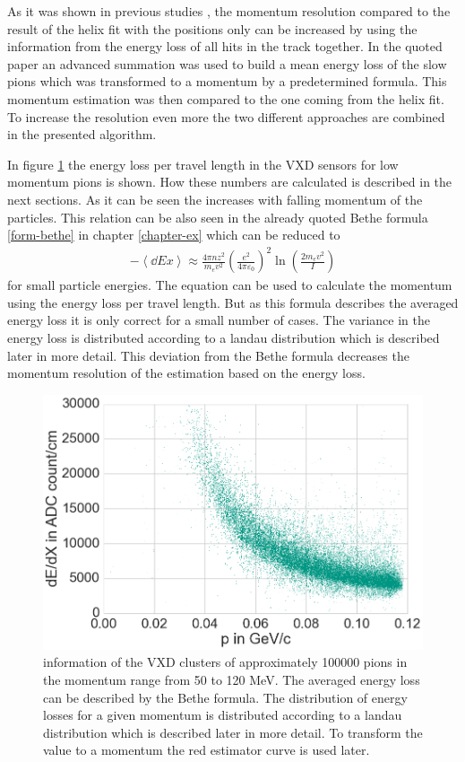 As it was shown in previous studies \cite{robert}, the momentum resolution compared to the result of the helix fit with the positions only can be increased by using the information from the energy loss of all hits in the track together. In the quoted paper an advanced summation was used to build a mean energy loss of the slow pions which was transformed to a momentum by a predetermined formula. This momentum estimation was then compared to the one coming from the helix fit. To increase the resolution even more the two different approaches are combined in the presented algorithm.

In figure \ref{fig-dedx-over-p} the energy loss per travel length in the VXD sensors for low momentum pions is shown. How these numbers are calculated is described in the next sections. As it can be seen the \dedx increases with falling momentum of the particles. This relation can be also seen in the already quoted Bethe formula \ref{form-bethe} in chapter \ref{chapter-ex} which can be reduced to 
\begin{align}
 -\left \langle \dd{E}{x} \right\rangle \approx \frac{4 \pi n z^2}{m_e v^2} \left( \frac{e^2}{4 \pi \varepsilon_0} \right)^2 \ln \left( \frac{2 m_e v^2}{I} \right) \label{form-bethe-simpl}
\end{align} 
for small particle energies. The equation can be used to calculate the momentum using the energy loss per travel length. But as this formula describes the averaged energy loss it is only correct for a small number of cases. The variance in the energy loss is distributed according to a landau distribution which is described later in more detail. This deviation from the Bethe formula decreases the momentum resolution of the estimation based on the energy loss.

\begin{figure}
 \centering
 \includegraphics[width=0.8\linewidth]{figures/vxd/dedx.png}
 \caption{\dedx information of the VXD clusters of approximately 100000 pions in the momentum range from 50 to 120 MeV. The averaged energy loss can be described by the Bethe formula. The distribution of energy losses for a given momentum is distributed according to a landau distribution which is described later in more detail. To transform the \dedx value to a momentum the red estimator curve is used later.}
 \label{fig-dedx-over-p}
\end{figure}


